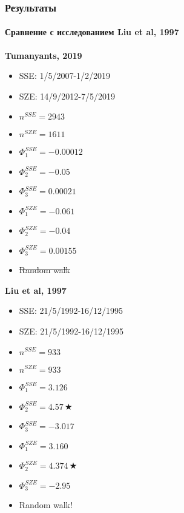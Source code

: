 \documentclass{beamer}
\begin{document}
\begin{frame}
\frametitle{Результаты}
\framesubtitle{Сравнение с исследованием Liu et al, 1997}
\begin{multicols}{2}
\begin{center}
	\textbf{Tumanyants, 2019}
\end{center}
\begin{itemize}
	\item SSE: 1/5/2007-1/2/2019
	\item SZE: 14/9/2012-7/5/2019
	\item $n^{SSE}=2943$
	\item $n^{SZE}=1611$
	\item $\Phi_1^{SSE}=-0.00012$
	\item $\Phi_2^{SSE}=-0.05$
	\item $\Phi_3^{SSE}=0.00021$
	\item $\Phi_1^{SZE}=-0.061$
	\item $\Phi_2^{SZE}=-0.04$
	\item $\Phi_3^{SZE}=0.00155$
	\item \sout{Random walk}
\end{itemize}
\begin{center}
	\textbf{Liu et al, 1997}
\end{center}
\begin{itemize}
	\item SSE: 21/5/1992-16/12/1995
	\item SZE: 21/5/1992-16/12/1995
	\item $n^{SSE}=933$
	\item $n^{SZE}=933$
	\item $\Phi_1^{SSE}=3.126$
	\item $\Phi_2^{SSE}=4.57\,\bigstar$
	\item $\Phi_3^{SSE}=-3.017$
	\item $\Phi_1^{SZE}=3.160$
	\item $\Phi_2^{SZE}=4.374\,\bigstar$
	\item $\Phi_3^{SZE}=-2.95$
	\item Random walk!
\end{itemize}
\end{multicols}
\end{frame}
\end{document}
